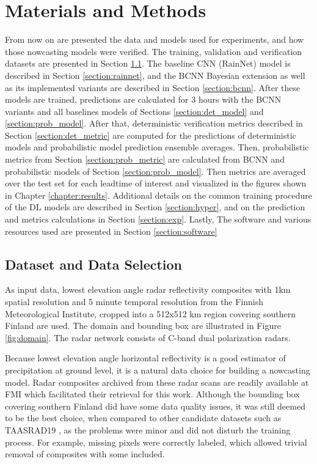 \chapter{Materials and Methods}
\label{chapter:methods}

From now on are presented the data and models used for experiments, and how those nowcasting models were verified. The training, validation and verification datasets are presented in Section \ref{section:data}. The baseline CNN (RainNet) model is described in Section \ref{section:rainnet}, and the BCNN Bayesian extension as well as its implemented variants are described in Section \ref{section:bcnn}. After these models are trained, predictions are calculated for 3 hours with the BCNN variants and all baselines models of Sections \ref{section:det_model} and \ref{section:prob_model}. After that, deterministic verification metrics described in Section \ref{section:det_metric} are computed for the predictions of deterministic models and probabilistic model prediction ensemble averages. Then, probabilistic metrics from Section \ref{section:prob_metric} are calculated from BCNN and probabilistic models of Section \ref{section:prob_model}. Then metrics are averaged over the test set for each leadtime of interest and visualized in the figures shown in Chapter \ref{chapter:results}. Additional details on the common training procedure of the DL models are described in Section \ref{section:hyper}, and on the prediction and metrics calculations in Section \ref{section:exp}. Lastly, The software and various resources used are presented in Section \ref{section:software}


\section{Dataset and Data Selection}
\label{section:data}

As input data, lowest elevation angle radar reflectivity composites with 1km spatial resolution and 5 minute temporal resolution from the Finnish Meteorological Institute, cropped into a 512x512 km region covering southern Finland are used. The domain and bounding box are illustrated in Figure \ref{fig:domain}. The radar network consists of C-band dual polarization radars. 

Because lowest elevation angle horizontal reflectivity is a good estimator of precipitation at ground level, it is a natural data choice for building a nowcasting model. Radar composites archived from these radar scans are readily available at FMI which facilitated their retrieval for this work. Although the bounding box covering southern Finland did have some data quality issues, it was still deemed to be the best choice, when compared to other candidate datasets such as TAASRAD19 \cite{franch_taasrad19_2020}, as the problems were minor and did not disturb the training process. For example, missing pixels were correctly labeled, which allowed trivial removal of composites with some included. 

